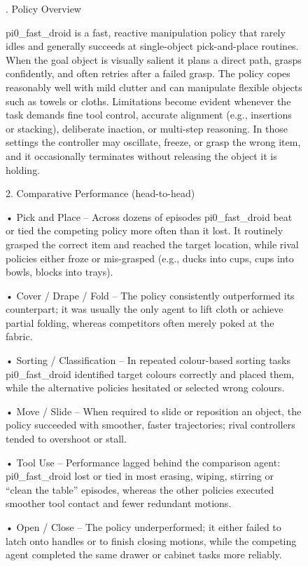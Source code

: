 \begin{figure}[ht!]
\colorbox{gray!10}{
\begin{minipage}{\linewidth}
\fontsize{7pt}{8pt}. Policy Overview \par
pi0\_fast\_droid is a fast, reactive manipulation policy that rarely idles and generally succeeds at single-object pick-and-place routines.  When the goal object is visually salient it plans a direct path, grasps confidently, and often retries after a failed grasp.  The policy copes reasonably well with mild clutter and can manipulate flexible objects such as towels or cloths.  Limitations become evident whenever the task demands fine tool control, accurate alignment (e.g., insertions or stacking), deliberate inaction, or multi-step reasoning.  In those settings the controller may oscillate, freeze, or grasp the wrong item, and it occasionally terminates without releasing the object it is holding. \par
\vspace{1em}
2. Comparative Performance (head-to-head)  \par
• Pick and Place – Across dozens of episodes pi0\_fast\_droid beat or tied the competing policy more often than it lost.  It routinely grasped the correct item and reached the target location, while rival policies either froze or mis-grasped (e.g., ducks into cups, cups into bowls, blocks into trays). \par
• Cover / Drape / Fold – The policy consistently outperformed its counterpart; it was usually the only agent to lift cloth or achieve partial folding, whereas competitors often merely poked at the fabric.  \par
• Sorting / Classification – In repeated colour-based sorting tasks pi0\_fast\_droid identified target colours correctly and placed them, while the alternative policies hesitated or selected wrong colours.  \par
• Move / Slide – When required to slide or reposition an object, the policy succeeded with smoother, faster trajectories; rival controllers tended to overshoot or stall. \par 
• Tool Use – Performance lagged behind the comparison agent: pi0\_fast\_droid lost or tied in most erasing, wiping, stirring or “clean the table” episodes, whereas the other policies executed smoother tool contact and fewer redundant motions.  \par
• Open / Close – The policy underperformed; it either failed to latch onto handles or to finish closing motions, while the competing agent completed the same drawer or cabinet tasks more reliably.  \par

\end{minipage}}
\end{figure}
